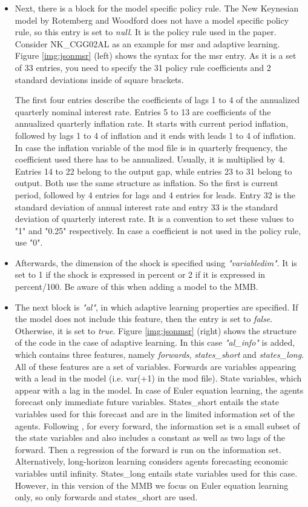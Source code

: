 \begin{itemize}
	\item Next, there is a block for the model specific policy rule. The New Keynesian model by Rotemberg and Woodford does not have a model specific policy rule, so this entry is set to \textit{null}. It is the policy rule used in the paper. Consider NK\_CGG02AL as an example for msr and adaptive learning. Figure \ref{img:jsonmsr} (left) shows the syntax for the msr entry. As it is a set of 33 entries, you need to specify the 31 policy rule coefficients and 2 standard deviations inside of square brackets. 
	
	The first four entries describe the coefficients of lags 1 to 4 of the annualized quarterly nominal interest rate.
	Entries 5 to 13 are coefficients of the annualized quarterly inflation rate. It starts with current period inflation, followed by lags 1 to 4 of inflation and it ends with leads 1 to 4 of inflation. In case the inflation variable of the mod file is in quarterly frequency, the coefficient used there has to be annualized. Usually, it is multiplied by 4.
	Entries 14 to 22 belong to the output gap, while entries 23 to 31 belong to output. Both use the same structure as inflation. So the first is current period, followed by 4 entries for lags and 4 entries for leads.
	Entry 32 is the standard deviation of annual interest rate and entry 33 is the standard deviation of quarterly interest rate. It is a convention to set these values to "1" and "0.25" respectively.   
	In case a coefficient is not used in the policy rule, use "0".
	\item  Afterwards, the dimension of the shock is specified using \textit{"variabledim"}. It is set to 1 if the shock is expressed in percent or 2 if it is expressed in percent/100. Be aware of this when adding a model to the MMB.
	\item The next block is \textit{"al"}, in which adaptive learning properties are specified. If the model does not include this feature, then the entry is set to \textit{false}. Otherwise, it is set to \textit{true}. Figure \ref{img:jsonmsr} (right) shows the structure of the code in the case of adaptive learning. In this case \textit{"al\_info"} is added, which contains three features, namely \textit{forwards}, \textit{states\_short} and \textit{states\_long}. All of these features are a set of variables. Forwards are variables appearing with a lead in the model (i.e. var(+1) in the mod file). State variables, which appear with a lag in the model. In case of Euler equation learning, the agents forecast only immediate future variables. States\_short entails the state variables used for this forecast and are in the limited information set of the agents. Following \cite{Slobodyan2012}, for every forward, the information set is a small subset of the state variables and also includes a constant as well as two lags of the forward. Then a regression of the forward is run on the information set. Alternatively, long-horizon learning considers agents forecasting economic variables until infinity. States\_long entails state variables used for this case. However, in this version of the MMB we focus on Euler equation learning only, so only forwards and states\_short are used.  

\end{itemize}
